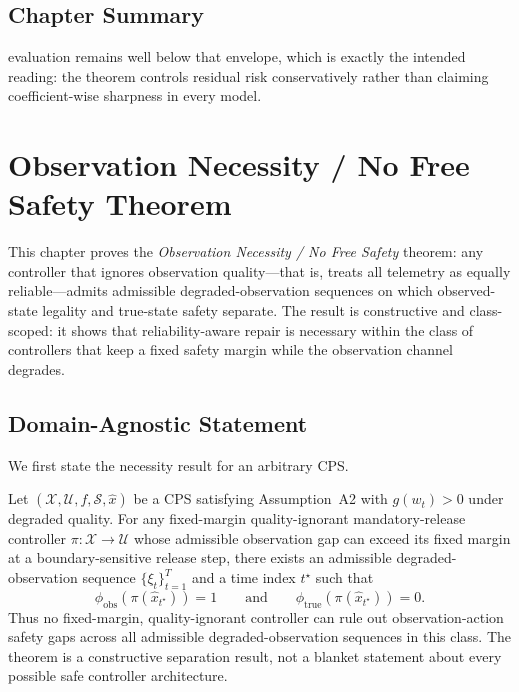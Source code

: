 \subsection{Chapter Summary}
evaluation remains well below that envelope, which is exactly the intended
reading: the theorem controls residual risk conservatively rather than
claiming coefficient-wise sharpness in every model.






\section{Observation Necessity / No Free Safety Theorem}
\label{ch:no-free-safety}

This chapter proves the \emph{Observation Necessity / No Free Safety} theorem: any controller
that ignores observation quality---that is, treats all telemetry as
equally reliable---admits admissible degraded-observation sequences on which
observed-state legality and true-state safety separate.  The result is
constructive and class-scoped: it shows that reliability-aware repair is
necessary within the class of controllers that keep a fixed safety margin
while the observation channel degrades.

\subsection{Domain-Agnostic Statement}

We first state the necessity result for an arbitrary CPS.

\begin{theorem}
\label{thm:no-free-safety-general}
Let $(\mathcal{X}, \mathcal{U}, f, \mathcal{S}, \hat{x})$ be a CPS
satisfying Assumption~A2 with $g(w_t) > 0$ under degraded quality.
For any fixed-margin quality-ignorant mandatory-release controller
$\pi : \mathcal{X} \to \mathcal{U}$ whose admissible observation gap can exceed
its fixed margin at a boundary-sensitive release step, there exists an
admissible degraded-observation sequence $\{\xi_t\}_{t=1}^T$ and a time index
$t^\star$ such that
\[
  \phi_{\mathrm{obs}}(\pi(\hat{x}_{t^\star})) = 1
  \qquad\text{and}\qquad
  \phi_{\mathrm{true}}(\pi(\hat{x}_{t^\star})) = 0.
\]
Thus no fixed-margin, quality-ignorant controller can rule out
observation-action safety gaps across all admissible degraded-observation
sequences in this class.  The theorem is a constructive separation result,
not a blanket statement about every possible safe controller architecture.
\end{theorem}

